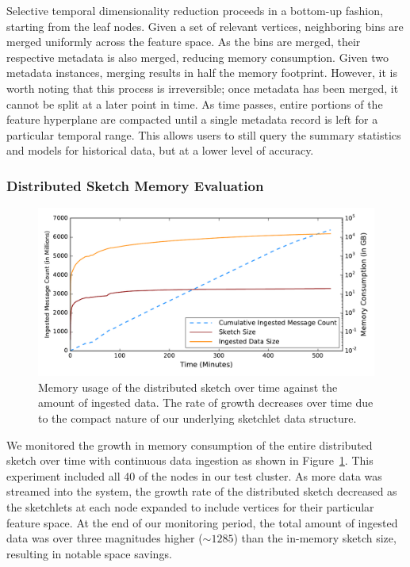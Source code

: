Selective temporal dimensionality reduction proceeds in a bottom-up fashion, starting from the leaf nodes. Given a set of relevant vertices, neighboring bins are merged uniformly across the feature space. As the bins are merged, their respective metadata is also merged, reducing memory consumption. Given two metadata instances, merging results in half the memory footprint. However, it is worth noting that this process is irreversible; once metadata has been merged, it cannot be split at a later point in time. As time passes, entire portions of the feature hyperplane are compacted until a single metadata record is left for a particular temporal range. This allows users to still query the summary statistics and models for historical data, but at a lower level of accuracy.

\subsubsection{Distributed Sketch Memory Evaluation}

\begin{figure}[b]
    \centerline{\includegraphics[width=\linewidth]{figures/ing-and-mem-usage.pdf}}
    \caption{Memory usage of the distributed sketch over time against the amount of ingested data. The rate of growth decreases over time due to the compact nature of our underlying sketchlet data structure.}
    \label{fig:dist-sketch-mem-usage}
\end{figure}

We monitored the growth in memory consumption of the entire distributed sketch over time with continuous data ingestion as shown in Figure~\ref{fig:dist-sketch-mem-usage}. This experiment included all 40 of the nodes in our test cluster.  As more data was streamed into the system, the growth rate of the distributed sketch decreased as the sketchlets at each node expanded to include vertices for their particular feature space.  At the end of our monitoring period, the total amount of ingested data was over three magnitudes higher ($\sim 1285$) than the in-memory sketch size, resulting in notable space savings.
